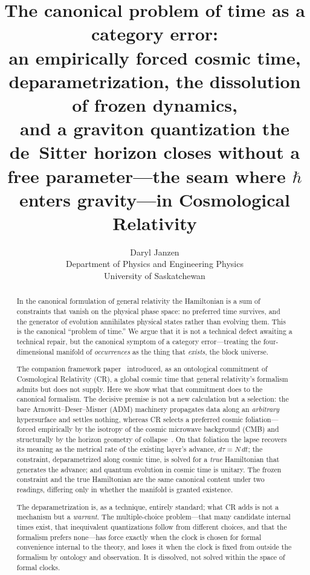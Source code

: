 \documentclass[11pt,a4paper]{article}
\title{The canonical problem of time as a category error:\\
\large an empirically forced cosmic time, deparametrization, the dissolution of frozen dynamics,\\
and a graviton quantization the de~Sitter horizon closes without a free parameter---the seam where $\hbar$ enters gravity---in Cosmological Relativity}
\author{Daryl Janzen\\
\small Department of Physics and Engineering Physics\\
\small University of Saskatchewan}
\date{}
\theoremstyle{plain}
\theoremstyle{definition}
\theoremstyle{remark}
\begin{document}
\maketitle

\begin{abstract}
In the canonical formulation of general relativity the Hamiltonian is a sum of constraints that vanish on the physical phase space: no preferred time survives, and the generator of evolution annihilates physical states rather than evolving them. This is the canonical ``problem of time.'' We argue that it is not a technical defect awaiting a technical repair, but the canonical symptom of a category error---treating the four-dimensional manifold of \emph{occurrences} as the thing that \emph{exists}, the block universe. 

The companion framework paper~\cite{JanzenCRframework} introduced, as an ontological commitment of Cosmological Relativity (CR), a global cosmic time that general relativity's formalism admits but does not supply. Here we show what that commitment does to the canonical formalism. The decisive premise is not a new calculation but a selection: the bare Arnowitt--Deser--Misner (ADM) machinery propagates data along an \emph{arbitrary} hypersurface and settles nothing, whereas CR selects a preferred cosmic foliation---forced empirically by the isotropy of the cosmic microwave background (CMB) and structurally by the horizon geometry of collapse~\cite{JanzenBHcausality}. On that foliation the lapse recovers its meaning as the metrical rate of the existing layer's advance, $d\tau = N\,dt$; the constraint, deparametrized along cosmic time, is solved for a \emph{true} Hamiltonian that generates the advance; and quantum evolution in cosmic time is unitary. The frozen constraint and the true Hamiltonian are the same canonical content under two readings, differing only in whether the manifold is granted existence. 

The deparametrization is, as a technique, entirely standard; what CR adds is not a mechanism but a \emph{warrant}. The multiple-choice problem---that many candidate internal times exist, that inequivalent quantizations follow from different choices, and that the formalism prefers none---has force exactly when the clock is chosen for formal convenience internal to the theory, and loses it when the clock is fixed from outside the formalism by ontology and observation. It is dissolved, not solved within the space of formal clocks. 


\end{abstract}
\end{document}
